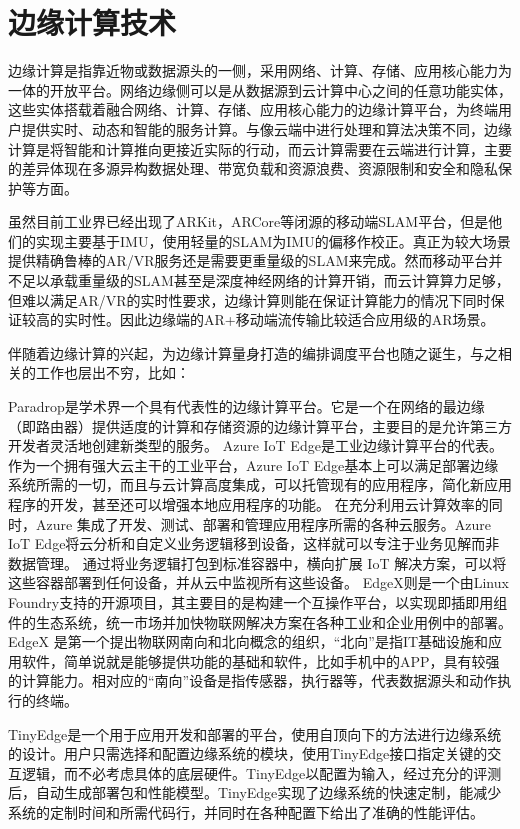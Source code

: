 \section{边缘计算技术}
边缘计算是指靠近物或数据源头的一侧，采用网络、计算、存储、应用核心能力为一体的开放平台。网络边缘侧可以是从数据源到云计算中心之间的任意功能实体，这些实体搭载着融合网络、计算、存储、应用核心能力的边缘计算平台，为终端用户提供实时、动态和智能的服务计算。与像云端中进行处理和算法决策不同，边缘计算是将智能和计算推向更接近实际的行动，而云计算需要在云端进行计算，主要的差异体现在多源异构数据处理、带宽负载和资源浪费、资源限制和安全和隐私保护等方面。

虽然目前工业界已经出现了ARKit，ARCore等闭源的移动端SLAM平台，但是他们的实现主要基于IMU，使用轻量的SLAM为IMU的偏移作校正。真正为较大场景提供精确鲁棒的AR/VR服务还是需要更重量级的SLAM来完成。然而移动平台并不足以承载重量级的SLAM甚至是深度神经网络的计算开销，而云计算算力足够，但难以满足AR/VR的实时性要求，边缘计算则能在保证计算能力的情况下同时保证较高的实时性。因此边缘端的AR+移动端流传输比较适合应用级的AR场景。

伴随着边缘计算的兴起，为边缘计算量身打造的编排调度平台也随之诞生，与之相关的工作也层出不穷，比如：

Paradrop\cite{WilDasBan14,WilDasBan142,LiuWilBan16,Ban18}是学术界一个具有代表性的边缘计算平台。它是一个在网络的最边缘（即路由器）提供适度的计算和存储资源的边缘计算平台，主要目的是允许第三方开发者灵活地创建新类型的服务。
Azure IoT Edge\cite{AzureIoTEdge}是工业边缘计算平台的代表。作为一个拥有强大云主干的工业平台，Azure IoT Edge基本上可以满足部署边缘系统所需的一切，而且与云计算高度集成，可以托管现有的应用程序，简化新应用程序的开发，甚至还可以增强本地应用程序的功能。 在充分利用云计算效率的同时，Azure 集成了开发、测试、部署和管理应用程序所需的各种云服务。Azure IoT Edge将云分析和自定义业务逻辑移到设备，这样就可以专注于业务见解而非数据管理。 通过将业务逻辑打包到标准容器中，横向扩展 IoT 解决方案，可以将这些容器部署到任何设备，并从云中监视所有这些设备。
EdgeX\cite{EdgeXFoundry}则是一个由Linux Foundry支持的开源项目，其主要目的是构建一个互操作平台，以实现即插即用组件的生态系统，统一市场并加快物联网解决方案在各种工业和企业用例中的部署。EdgeX 是第一个提出物联网南向和北向概念的组织，“北向”是指IT基础设施和应用软件，简单说就是能够提供功能的基础和软件，比如手机中的APP，具有较强的计算能力。相对应的“南向”设备是指传感器，执行器等，代表数据源头和动作执行的终端。

TinyEdge\cite{ZhaZhaFan20}是一个用于应用开发和部署的平台，使用自顶向下的方法进行边缘系统的设计。用户只需选择和配置边缘系统的模块，使用TinyEdge接口指定关键的交互逻辑，而不必考虑具体的底层硬件。TinyEdge以配置为输入，经过充分的评测后，自动生成部署包和性能模型。TinyEdge实现了边缘系统的快速定制，能减少系统的定制时间和所需代码行，并同时在各种配置下给出了准确的性能评估。

